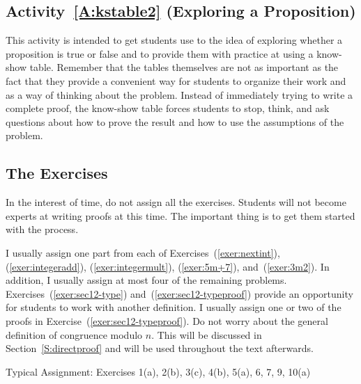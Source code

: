 \subsection*{Activity~\ref{A:kstable2} (Exploring a Proposition)}
This activity is intended to get students use to the idea of exploring whether a proposition is true or false and to provide them with practice at using a know-show table.  Remember that the tables themselves are not as important as the fact that they provide a convenient way for students to organize their work and as a way of thinking about the problem.    Instead of immediately trying to write a complete proof, the know-show table forces students to stop, think, and ask questions about how to prove the result and how to use the assumptions of the problem.
\hbreak

\subsection*{The Exercises}

In the interest of time, do not assign all the exercises.  Students will not become experts at writing proofs at this time.  The important thing is to get them started with the process.


I usually assign one part from each of Exercises~(\ref{exer:nextint}), (\ref{exer:integeradd}), (\ref{exer:integermult}), (\ref{exer:5m+7}), and~(\ref{exer:3m2}).  In addition, I usually assign at most four of the remaining problems.  
Exercises~(\ref{exer:sec12-type}) and~(\ref{exer:sec12-typeproof}) provide an opportunity for students to work with another definition.  I usually assign one or two of the proofs in Exercise~(\ref{exer:sec12-typeproof}).  Do not worry about the general definition of congruence modulo $n$.  This will be discussed in Section~\ref{S:directproof} and will be used throughout the text afterwards.

\vskip6pt
\noindent
Typical Assignment:  Exercises 1(a), 2(b), 3(c), 4(b), 5(a), 6, 7, 9, 10(a)

\hbreak










\endinput

